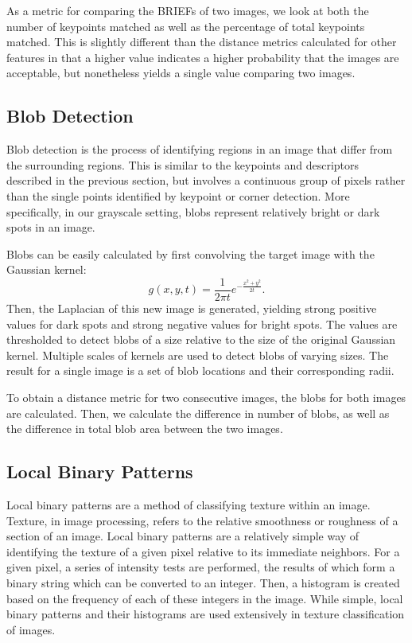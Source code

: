 As a metric for comparing the BRIEFs of two images, we look at both the number of keypoints matched as well as the percentage of total keypoints matched. 
This is slightly different than the distance metrics calculated for other features in that a higher value indicates a higher probability that the images are acceptable, but nonetheless yields a single value comparing two images.


\subsection{Blob Detection}

Blob detection is the process of identifying regions in an image that differ from the surrounding regions.
This is similar to the keypoints and descriptors described in the previous section, but involves a continuous group of pixels rather than the single points identified by keypoint or corner detection.
More specifically, in our grayscale setting, blobs represent relatively bright or dark spots in an image.

Blobs can be easily calculated by first convolving the target image with the Gaussian kernel:
\begin{equation*}
g(x, y, t) = \frac{1}{2\pi t}e^{-\frac{x^2 + y^2}{2t}} .
\end{equation*}
Then, the Laplacian of this new image is generated, yielding strong positive values for dark spots and strong negative values for bright spots.
The values are thresholded to detect blobs of a size relative to the size of the original Gaussian kernel.
Multiple scales of kernels are used to detect blobs of varying sizes.
The result for a single image is a set of blob locations and their corresponding radii.

To obtain a distance metric for two consecutive images, the blobs for both images are calculated.
Then, we calculate the difference in number of blobs, as well as the difference in total blob area between the two images.


\subsection{Local Binary Patterns}

Local binary patterns are a method of classifying texture within an image.
Texture, in image processing, refers to the relative smoothness or roughness of a section of an image.
Local binary patterns are a relatively simple way of identifying the texture of a given pixel relative to its immediate neighbors.
For a given pixel, a series of intensity tests are performed, the results of which form a binary string which can be converted to an integer.
Then, a histogram is created based on the frequency of each of these integers in the image.
While simple, local binary patterns and their histograms are used extensively in texture classification of images.

